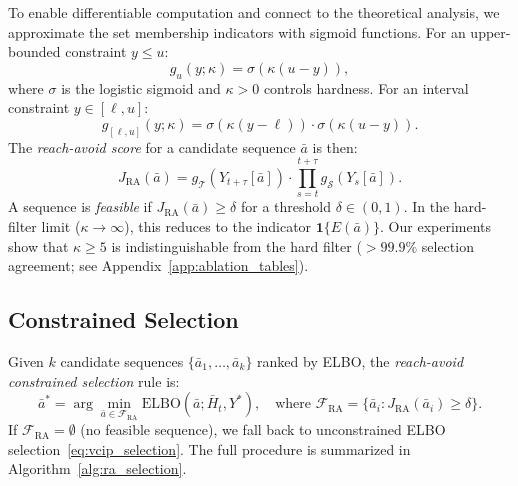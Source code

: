 \documentclass{article}
\newcommand{\bH}{\bar{H}}
\newcommand{\ba}{\bar{a}}
\newcommand{\cT}{\mathcal{T}}
\newcommand{\cS}{\mathcal{S}}
\newcommand{\cF}{\mathcal{F}}
\newcommand{\ind}{\mathbf{1}}
\begin{document}
To enable differentiable computation and connect to the theoretical analysis, we approximate the set membership indicators with sigmoid functions. For an upper-bounded constraint $y \leq u$:
\begin{equation}
g_u(y; \kappa) = \sigma(\kappa(u - y)),
\end{equation}
where $\sigma$ is the logistic sigmoid and $\kappa > 0$ controls hardness. For an interval constraint $y \in [\ell, u]$:
\begin{equation}
g_{[\ell, u]}(y; \kappa) = \sigma(\kappa(y - \ell)) \cdot \sigma(\kappa(u - y)).
\end{equation}
The \emph{reach-avoid score} for a candidate sequence $\ba$ is then:
\begin{equation}
\label{eq:ra_score}
J_{\mathrm{RA}}(\ba) = g_{\cT}(Y_{t+\tau}[\ba]) \cdot \prod_{s=t}^{t+\tau} g_{\cS}(Y_s[\ba]).
\end{equation}
A sequence is \emph{feasible} if $J_{\mathrm{RA}}(\ba) \geq \delta$ for a threshold $\delta \in (0, 1)$. In the hard-filter limit ($\kappa \to \infty$), this reduces to the indicator $\ind\{E(\ba)\}$. Our experiments show that $\kappa \geq 5$ is indistinguishable from the hard filter ($>99.9\%$ selection agreement; see Appendix~\ref{app:ablation_tables}).

\subsection{Constrained Selection}
\label{sec:constrained_selection}

Given $k$ candidate sequences $\{\ba_1, \ldots, \ba_k\}$ ranked by ELBO, the \emph{reach-avoid constrained selection} rule is:
\begin{equation}
\label{eq:constrained}
\ba^* = \arg\min_{\ba \in \cF_{\mathrm{RA}}} \mathrm{ELBO}(\ba; \bH_t, Y^*),
\quad \text{where } \cF_{\mathrm{RA}} = \{\ba_i : J_{\mathrm{RA}}(\ba_i) \geq \delta\}.
\end{equation}
If $\cF_{\mathrm{RA}} = \emptyset$ (no feasible sequence), we fall back to unconstrained ELBO selection~\eqref{eq:vcip_selection}. The full procedure is summarized in Algorithm~\ref{alg:ra_selection}.
\end{document}
